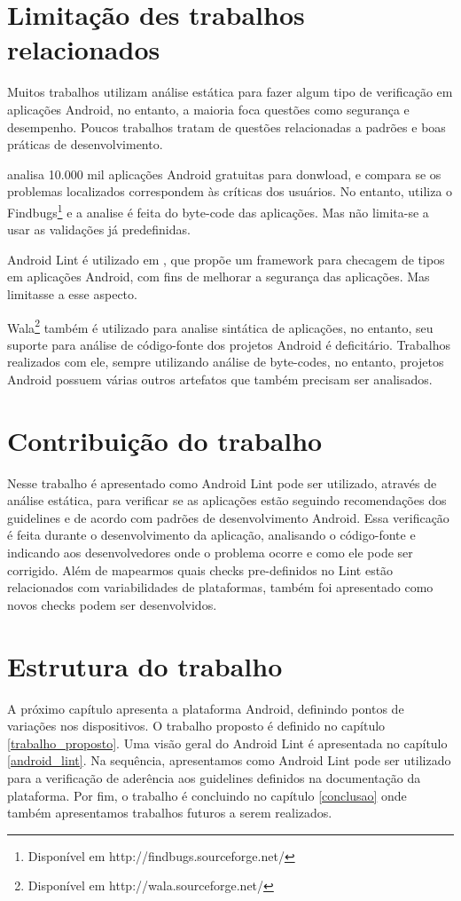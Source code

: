 \section{Limitação des trabalhos relacionados}
Muitos trabalhos utilizam análise estática para fazer algum tipo de verificação
em aplicações Android, no entanto, a maioria foca questões como segurança e
desempenho. Poucos trabalhos tratam de questões relacionadas a padrões e boas
práticas de desenvolvimento.

\cite{findbug_10k} analisa 10.000 mil aplicações Android gratuitas para donwload,
e compara se os problemas localizados correspondem às críticas dos usuários. No
entanto, utiliza o Findbugs\footnote{Disponível em http://findbugs.sourceforge.net/}
e a analise é feita do byte-code das aplicações. Mas não limita-se a usar as validações
já predefinidas.

Android Lint é utilizado em \cite{lintent}, que propõe um framework para checagem
de tipos em aplicações Android, com fins de melhorar a segurança das aplicações.
Mas limitasse a esse aspecto.

Wala\footnote{Disponível em http://wala.sourceforge.net/} também é utilizado para
analise sintática de aplicações, no entanto, seu suporte para análise de código-fonte
dos projetos Android é deficitário. Trabalhos realizados com ele, sempre utilizando
análise de byte-codes, no entanto, projetos Android possuem várias outros artefatos 
que também precisam ser analisados.

\section{Contribuição do trabalho}
Nesse trabalho é apresentado como Android Lint pode ser utilizado, através de análise
estática, para verificar se as aplicações estão seguindo recomendações dos guidelines
e de acordo com padrões de desenvolvimento Android. Essa verificação é feita durante
o desenvolvimento da aplicação, analisando o código-fonte e indicando aos desenvolvedores
onde o problema ocorre e como ele pode ser corrigido. Além de mapearmos quais checks
pre-definidos no Lint estão relacionados com variabilidades de plataformas, também
foi apresentado como novos checks podem ser desenvolvidos.

\section{Estrutura do trabalho}
A próximo capítulo apresenta a plataforma Android, definindo pontos de variações nos
dispositivos. O trabalho proposto é definido no capítulo \ref{trabalho_proposto}. 
Uma visão geral do Android Lint é apresentada no capítulo \ref{android_lint}. Na
sequência, apresentamos como Android Lint pode ser utilizado para a verificação
de aderência aos guidelines definidos na documentação da plataforma. Por fim, o
trabalho é concluindo no capítulo \ref{conclusao} onde também apresentamos trabalhos
futuros a serem realizados.
